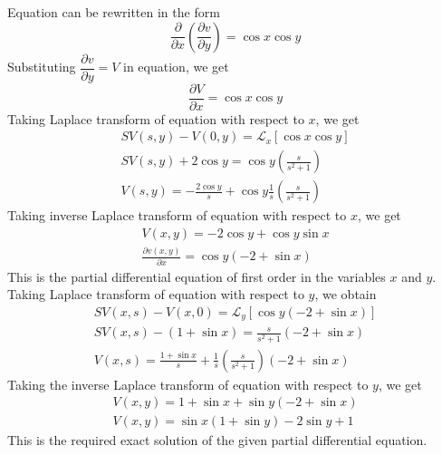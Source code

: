\documentclass[11pt]{report}
\newcommand{\Laplace}{\mathcal{L}}
\newcommand{\NI}{\noindent}
\newcommand{\sps}{\\[0.2cm]}
\newcommand{\dsp}{\displaystyle}
\begin{document}
	\NI Equation can be rewritten in the form 
	\begin{equation*}
		\dfrac{\partial}{\partial x}\left(\frac{\partial v}{\partial y}\right) = \cos x\cos y \label{p:4_2_3}
	\end{equation*}
	Substituting $\dfrac{\partial v}{\partial y} = V$ in equation, we get
	\begin{equation*}
		\frac{\partial V}{\partial x} = \cos x\cos y \label{p:4_2_4}
	\end{equation*}
	Taking Laplace transform of equation  with respect to $x$, we get
	\begin{equation*}
		\begin{array}{l}
			SV(s,y) - V(0,y) = \Laplace_x\left[\cos x \cos y\right]\sps
			\dsp SV(s,y) + 2\cos y = \cos y \left(\frac{s}{s^2+1}\right)\sps
			\dsp V(s,y) = -\frac{2\cos y}{s} + \cos y \frac{1}{s}\left(\frac{s}{s^2 + 1}\right)
		\end{array}\label{p:4_2_5}
	\end{equation*}
	Taking inverse Laplace transform of equation with respect to $x$, we get
	\begin{equation*}
		\begin{array}{l}
			V(x,y) = -2\cos y + \cos y\sin x\sps
			\dsp\frac{\partial v(x,y)}{\partial x}=\cos y(-2 + \sin x)
		\end{array}\label{p:4_2_6}
	\end{equation*}
	This is the partial differential equation of first order in  the variables $x$ and $y$.\sps
	Taking Laplace transform of equation with respect to $y$, we obtain
	\begin{equation*}
		\begin{array}{l}
			\dsp SV(x,s)-V(x,0) = \Laplace_y\left[\cos y(-2+\sin x)\right]\sps
			\dsp SV(x,s)-(1+\sin x) = \dsp\frac{s}{s^2 + 1}(-2 + \sin x)\sps
			\dsp V(x,s) = \frac{1+\sin x}{s} + \frac{1}{s}\left(\frac{s}{s^2+1}\right)(-2+\sin x)
		\end{array}\label{p:4_2_7} 
	\end{equation*}
	Taking the inverse Laplace transform of equation  with respect to $y$, we get
	\begin{equation*}
		\begin{array}{l}
			\dsp V(x,y)= 1+\sin x + \sin y(-2 + \sin x)\sps
			\dsp V(x,y) = \sin x(1+\sin y) - 2\sin y + 1
		\end{array}
	\end{equation*}
	This is the required exact solution of the given partial differential equation.
\end{document}
